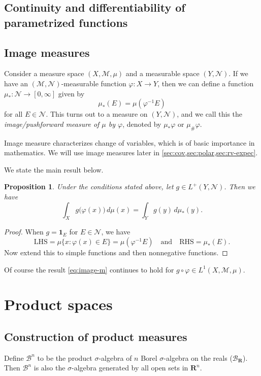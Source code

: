 \documentclass[10pt]{article}
\numberwithin{equation}{section}
\theoremstyle{plain-star}
\newtheorem{prop}[equation]{Proposition}
\theoremstyle{definition-star}
\theoremstyle{remark-star}
\theoremstyle{plain-star}
\newcommand{\R}{\mathbf{R}}
\newcommand{\ind}{\mathbf{1}}
\newcommand{\B}{\mathcal{B}}
\renewcommand{\phi}{\varphi}
\newcommand{\df}[1]{\textit{#1}}
\begin{document}
\subsection{Continuity and differentiability of parametrized functions}

\subsection{Image measures}
Consider a measure space $(X,\mathcal{M},\mu)$ and a measurable space $(Y,\mathcal{N})$. If we have an $(\mathcal{M},\mathcal{N})$-measurable function $\phi\colon X \to Y$, then we can define a function $\mu_{*}\colon \mathcal{N} \to [0,\infty]$ given by \[
    \mu_{*}(E) =  \mu(\phi^{-1}E)
\] for all $E\in \mathcal{N}$. This turns out to a measure on $(Y,\mathcal N)$, and we call this the \df{image/pushforward measure of $\mu$ by $\phi$}, denoted by $\mu_*\phi$ or $\mu_{\#}\phi$.

Image measure characterizes change of variables, which is of basic importance in mathematics. We will use image measures later in \cref{sec:cov,sec:polar,sec:rv-expec}.

We state the main result below.
\begin{prop}
    Under the conditions stated above, let $g\in L^+(Y,\mathcal{N})$. Then we have \begin{equation}
        \int_X g\bigl(\phi(x)\bigr) \,d\mu(x) = \int_Y g(y) \,d\mu_*(y). \label{eq:image-m}
    \end{equation}
\end{prop}
\begin{proof}
    When $g = \ind_E$ for $E \in \mathcal{N}$, we have \[
        \mathrm{LHS} = \mu\{x : \phi(x) \in E\} = \mu(\phi^{-1} E) \quad \text{and} \quad 
        \mathrm{RHS} = \mu_{*}(E).
    \] Now extend this to simple functions and then nonnegative functions.
\end{proof}
Of course the result \eqref{eq:image-m} continues to hold for $g \circ \phi \in L^1(X,\mathcal{M},\mu)$.

\section{Product spaces}
\subsection{Construction of product measures}

Define $\B^n$ to be the product $\sigma$-algebra of $n$ Borel $\sigma$-algebra on the reals ($\B_{\R}$). Then $\B^n$ is also the $\sigma$-algebra generated by all open sets in $\R^n$.
\end{document}
